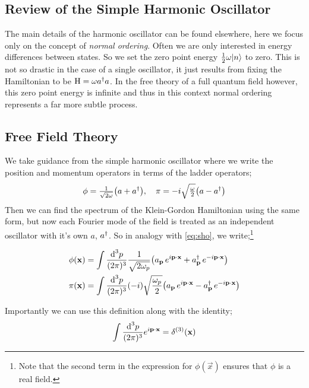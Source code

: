 \subsection{Review of the Simple Harmonic Oscillator}
The main details of the harmonic oscillator can be found elsewhere, here we focus only on the concept of \emph{normal ordering}. Often we are only interested in energy differences between states. So we set the zero point energy $\tfrac{1}{2} \omega \ket{n}$ to zero. This is not so drastic in the case of a single oscillator, it just results from fixing the Hamiltonian to be $\text{H} = \omega a^{\dagger} a$. In the free theory of a full quantum field however, this zero point energy is infinite and thus in this context normal ordering represents a far more subtle process. 
\subsection{Free Field Theory}
We take guidance from the simple harmonic oscillator where we write the position and momentum operators in terms of the ladder operators;
\begin{equation}
\label{eq:sho}
\phi = \tfrac{1}{\sqrt{2\omega}}\left(a + a\dagg\right), \quad \pi = -i \sqrt{\tfrac{\omega}{2}} \left(a - a\dagg\right)
\end{equation}
Then we can find the spectrum of the Klein-Gordon Hamiltonian using the same form, but now each Fourier mode of the field is treated as an independent oscillator with it's own $a$, $a^{\dagger}$. So in analogy with \eqref{eq:sho}, we write;\footnote{Note that the second term in the expression for $\phi(\vec x)$ ensures that $\phi$ is a real field.}
\begin{definitionbox}
\vspace{-10pt}
\begin{align}
\label{eq:kgfield}
\phi(\vec x) &= \int{\frac{\ud^3 p}{(2\pi)^3}\frac{1}{\sqrt{2\omega_p}} \left(a_{\vec p}\, e^{i\vec{p} 
\cdot \vec{x}} + a_{\vec p}\dagg \,e^{-i\vec{p}\cdot\vec{x}}\right)} \\
\pi(\vec x) &= \int{\frac{\ud^3 p}{(2\pi)^3}(-i)\sqrt{\frac{\omega_p}{2}} \left(a_{\vec p}\, e^{i\vec{p} 
\cdot \vec{x}} - a_{\vec p}\dagg\, e^{-i\vec{p}\cdot\vec{x}}\right)}
\end{align}
\end{definitionbox}
Importantly we can use this definition along with the identity;
\begin{equation}
\int{\frac{\text{d}^3 p}{(2\pi)^3}e^{i \mathbf{p} \cdot \mathbf{x}}} = \delta^{(3)}(\mathbf x)
\end{equation}
